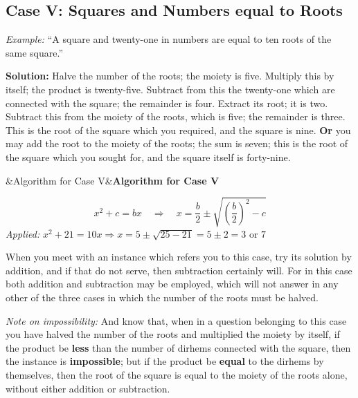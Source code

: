 \documentclass[11pt,a4paper,openany,oneside]{book}
\newcommand{\cnote}[1]{\textcolor{notecolor}{\textit{#1}}}
\newenvironment{mathbox}[1][]{%
  \smallskip\par\noindent
  \begin{lrbox}{\mathboxsave}
  \begin{minipage}{\dimexpr\linewidth-2\fboxsep-2\fboxrule\relax}%
  \setlength{\parskip}{0.3em}%
  \ifx&#1&\else\textbf{#1}\\[0.2cm]\fi
}{%
  \end{minipage}%
  \end{lrbox}
  \fcolorbox{sectioncolor}{mathbg}{\usebox{\mathboxsave}}%
  \smallskip}
\begin{document}
\begin{minipage}[t]{0.48\textwidth}
\raggedright

\subsection*{Case V: Squares and Numbers equal to Roots}

\textit{Example:} ``A square and twenty-one in numbers are equal to ten roots of the same square.''

\textbf{Solution:} Halve the number of the roots; the moiety is five. Multiply this by itself; the product is twenty-five. Subtract from this the twenty-one which are connected with the square; the remainder is four. Extract its root; it is two. Subtract this from the moiety of the roots, which is five; the remainder is three. This is the root of the square which you required, and the square is nine. \textbf{Or} you may add the root to the moiety of the roots; the sum is seven; this is the root of the square which you sought for, and the square itself is forty-nine.

\begin{mathbox}[Algorithm for Case V]
\begin{equation}
x^2 + c = bx \quad\Longrightarrow\quad x = \frac{b}{2} \pm \sqrt{\left(\frac{b}{2}\right)^2 - c}
\end{equation}
\textit{Applied:} $x^2 + 21 = 10x \Rightarrow x = 5 \pm \sqrt{25 - 21} = 5 \pm 2 = 3 \text{ or } 7$
\end{mathbox}

When you meet with an instance which refers you to this case, try its solution by addition, and if that do not serve, then subtraction certainly will. For in this case both addition and subtraction may be employed, which will not answer in any other of the three cases in which the number of the roots must be halved.

\cnote{Note on impossibility:} And know that, when in a question belonging to this case you have halved the number of the roots and multiplied the moiety by itself, if the product be \textbf{less} than the number of dirhems connected with the square, then the instance is \textbf{impossible}; but if the product be \textbf{equal} to the dirhems by themselves, then the root of the square is equal to the moiety of the roots alone, without either addition or subtraction.

\end{minipage}
\vspace{0.3cm}
\end{document}
